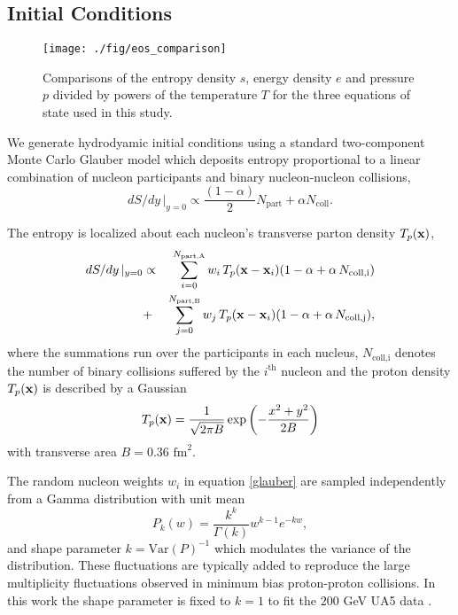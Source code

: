 \documentclass[aps,prc,reprint,amsmath,nofootinbib,superscriptaddress]{revtex4-1}
\begin{document}
\subsection{Initial Conditions}

\begin{figure}
  \texttt{[image: ./fig/eos\_comparison]}
  \caption{\label{fig:eos} Comparisons of the entropy density $s$, energy density $e$ and pressure $p$ divided by powers of the temperature $T$ for the 
	   three equations of state used in this study.}
\end{figure}

We generate hydrodyamic initial conditions using a standard two-component Monte Carlo Glauber model which deposits entropy proportional to a linear 
combination of nucleon participants and binary nucleon-nucleon collisions,
\begin{equation}
 dS/dy \,\vert_{y=0} \propto \frac{(1-\alpha)}{2}N_\text{part} + \alpha N_\text{coll}.
 \label{twocomponent}
\end{equation}

The entropy is localized about each nucleon's transverse parton density $T_p({\bf x})$,
\begin{eqnarray}
 dS/dy \,\vert_{y=0} &\propto& \sum\limits_{i=0}^{N_\text{part,A}} w_i\, T_p({\bf x} - {\bf x}_i)(1-\alpha + \alpha\, N_\text{coll,i}) \nonumber \\
                     &+& \sum\limits_{j=0}^{N_\text{part,B}} w_j\, T_p({\bf x} - {\bf x}_i)(1-\alpha + \alpha\, N_\text{coll,j}),
 \label{glauber}
\end{eqnarray}
where the summations run over the participants in each nucleus, $N_\text{coll,i}$ denotes the number of binary collisions suffered by the $i^\text{th}$ 
nucleon and the proton density $T_p({\bf x})$ is described by a Gaussian
\begin{equation}
 T_p({\bf x}) = \frac{1}{\sqrt{2 \pi B}} \exp \left(-\frac{x^2+y^2}{2 B} \right)
\end{equation}
with transverse area $B = 0.36$ $\text{fm}^2$.

The random nucleon weights $w_i$ in equation \eqref{glauber} are sampled independently from a Gamma distribution with unit mean
\begin{equation}
 P_k(w) = \frac{k^k}{\Gamma(k)} w^{k-1} e^{-k w},
\end{equation}
and shape parameter $k = \text{Var}(P)^{-1}$ which modulates the variance of the distribution. These fluctuations are typically added \cite{?} to reproduce 
the large multiplicity fluctuations observed in minimum bias proton-proton collisions. In this work the shape parameter is fixed to $k=1$ to fit the $200$ 
GeV UA5 data \cite{?}. 
\end{document}
